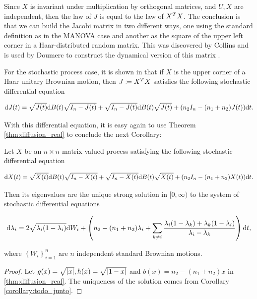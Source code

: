 Since $X$ is invariant under multiplication by orthogonal matrices, and $U,X$ are independent, then the law of $J$ is equal to the law of $X^T X$. The conclusion is that we can build the Jacobi matrix in two different ways, one using the standard definition as in the MANOVA case and another as the square of the upper left corner in a Haar-distributed random matrix. This was discovered by Collins \cite{thesis:collins} and is used by Doumerc to construct the dynamical version of this matrix \cite{doumerc2005matrices}.

For the stochastic process case, it is shown in \cite{doumerc2005matrices} that if $X$ is the upper corner of a Haar unitary Brownian motion, then $J \coloneqq X^T X$ satisfies the following stochastic differential equation

\begin{equation*}
    \mathrm d J (t) = \sqrt{J(t)} \mathrm d B(t) \sqrt{I_n - J(t)} + \sqrt{I_n - J(t)} \mathrm d B(t) \sqrt{J(t)} + (n_2 I_n - (n_1 + n_2) J(t) ) \mathrm d t.
\end{equation*}

With this differential equation, it is easy again to use Theorem \ref{thm:diffusion_real} to conclude the next Corollary: 

\begin{corollary}
    Let $X$ be an $n\times n$ matrix-valued process satisfying the following stochastic differential equation

    \begin{equation*}
        \mathrm d X (t) = \sqrt{X(t)} \mathrm d B(t) \sqrt{I_n - X(t)} + \sqrt{I_n - X(t)} \mathrm d B(t) \sqrt{X(t)} + (n_2 I_n - (n_1 + n_2) X(t) ) \mathrm d t.
    \end{equation*}

    Then its eigenvalues are the unique strong solution in $[0,\infty)$ to the system of stochastic differential equations

    \begin{equation} \label{eq:jacobi}
        \mathrm d \lambda_i = 2 \sqrt{\lambda_i(1-\lambda_i)} \mathrm d W_i + \left( n_2 -(n_1 + n_2)\lambda_i + \sum_{k\neq i} \frac{\lambda_i(1-\lambda_k) + \lambda_k(1-\lambda_i)}{\lambda_i - \lambda_k} \right) \mathrm d t,
    \end{equation}

    \noindent where $\left\{ W_{i} \right\}_{i=1}^n$ are $n$ independent standard Brownian motions.
\end{corollary}


\begin{proof}
    Let $g(x) = \sqrt{\lvert x \rvert}, h(x) = \sqrt{\lvert 1-x \rvert}$ and $b(x) = n_2 - (n_1 + n_2)x$ in \ref{thm:diffusion_real}. The uniqueness of the solution comes from Corollary \ref{corollary:todo_junto}.
\end{proof}


